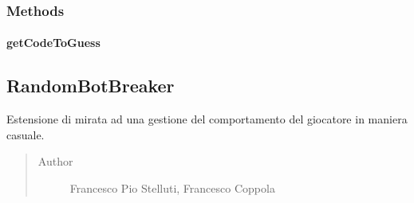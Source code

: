 \documentclass[letterpaper,10pt,italian,openany,oneside]{sphinxmanual}
\begin{document}
\subsubsection{Methods}
\label{\detokenize{test/it/unicam/cs/pa/mastermind/players/InteractiveMaker:methods}}

\paragraph{getCodeToGuess}
\label{\detokenize{test/it/unicam/cs/pa/mastermind/players/InteractiveMaker:getcodetoguess}}

\begin{fulllineitems}
\label{\detokenize{test/it/unicam/cs/pa/mastermind/players/InteractiveMaker:it.unicam.cs.pa.mastermind.players.InteractiveMaker.getCodeToGuess()}}
\end{fulllineitems}



\subsection{RandomBotBreaker}
\label{\detokenize{test/it/unicam/cs/pa/mastermind/players/RandomBotBreaker:randombotbreaker}}\label{\detokenize{test/it/unicam/cs/pa/mastermind/players/RandomBotBreaker::doc}}

\begin{fulllineitems}
\label{\detokenize{test/it/unicam/cs/pa/mastermind/players/RandomBotBreaker:it.unicam.cs.pa.mastermind.players.RandomBotBreaker}}
Estensione di  mirata ad una gestione del comportamento del giocatore in maniera casuale.
\begin{quote}\begin{description}
\item[{Author}] \leavevmode
Francesco Pio Stelluti, Francesco Coppola

\end{description}\end{quote}

\end{fulllineitems}
\end{document}
